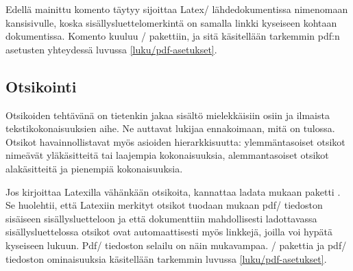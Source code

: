 \begin{koodilohkosis}
\end{koodilohkosis}

Edellä mainittu komento  täytyy sijoittaa Latex\-/
lähdedokumentissa nimenomaan kansisivulle, koska
sisällysluettelomerkintä on samalla linkki kyseiseen kohtaan
dokumentissa. Komento kuuluu \-/ pakettiin, ja sitä
käsitellään tarkemmin pdf:n asetusten yhteydessä luvussa
\ref{luku/pdf-asetukset}.

\subsection{Otsikointi}
\label{luku/otsikot}

Otsikoiden tehtävänä on tietenkin jakaa sisältö mielekkäisiin osiin ja
ilmaista tekstikokonaisuuksien aihe. Ne auttavat lukijaa ennakoimaan,
mitä on tulossa. Otsikot havainnollistavat myös asioiden
hierarkkisuutta: ylemmäntasoiset otsikot nimeävät yläkäsitteitä tai
laajempia kokonaisuuksia, alemmantasoiset otsikot alakäsitteitä ja
pienempiä kokonaisuuksia.

Jos kirjoittaa Latexilla vähänkään otsikoita, kannattaa ladata mukaan
paketti . Se huolehtii, että Latexiin merkityt otsikot
tuodaan mukaan pdf\-/ tiedoston sisäiseen sisällysluetteloon ja että
dokumenttiin mahdollisesti ladottavassa sisällysluettelossa otsikot ovat
automaattisesti myös linkkejä, joilla voi hypätä kyseiseen lukuun.
Pdf\-/ tiedoston selailu on näin mukavampaa. \-/
pakettia ja pdf\-/ tiedoston ominaisuuksia käsitellään tarkemmin luvussa
\ref{luku/pdf-asetukset}.


